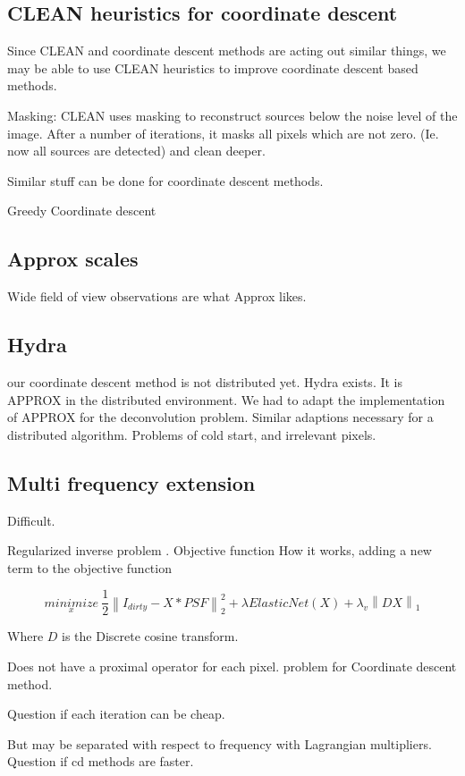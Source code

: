 \subsection{CLEAN heuristics for coordinate descent}
Since CLEAN and coordinate descent methods are acting out similar things, we may be able to use CLEAN heuristics to improve coordinate descent based methods.

Masking: CLEAN uses masking to reconstruct sources below the noise level of the image. After a number of iterations, it masks all pixels which are not zero. (Ie. now all sources are detected) and clean deeper. 

Similar stuff can be done for coordinate descent methods. 

Greedy Coordinate descent

\subsection{Approx scales}
Wide field of view observations are what Approx likes.

\subsection{Hydra}
our coordinate descent method is not distributed yet. Hydra exists. It is APPROX in the distributed environment.
We had to adapt the implementation of APPROX for the deconvolution problem. Similar adaptions necessary for a distributed algorithm. Problems of cold start, and irrelevant pixels.





\subsection{Multi frequency extension}\label{discussion:mfs}
Difficult.

Regularized inverse problem  \cite{ferrari2015multi}. Objective function 
How it works, adding a new term to the objective function

\begin{equation}\label{cd:deconv}
\underset{x}{minimize} \: \frac{1}{2} \left \| I_{dirty} - X * PSF \right \|_2^2 + \lambda ElasticNet(X) + \lambda_v \left \| DX \right \|_1
\end{equation}

Where $D$ is the Discrete cosine transform.

Does not have a proximal operator for each pixel. problem for Coordinate descent method.

Question if each iteration can be cheap.

But may be separated with respect to frequency with Lagrangian multipliers. Question if cd methods are faster.
